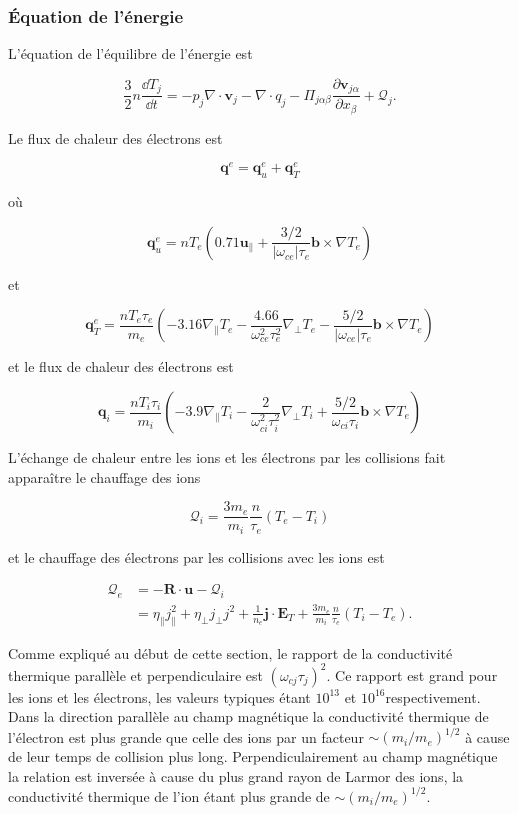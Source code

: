 \documentclass[main.tex]{subfiles}
\begin{document}
\subsubsection*{Équation de l'énergie}

L'équation de l'équilibre de l'énergie est

\[
	\frac{3}{2} n \frac{\dd T_j}{\dd t} = - p_j \nabla \cdot \bm{v}_j - \nabla \cdot q_j - \Pi_{j\alpha \beta} \frac{\partial \bm{v}_{j\alpha}}{\partial x_\beta} + \bm{\mathcal{Q}}_j.
\]

\nit Le flux de chaleur des électrons est

\[
	\bm{q}^e = \bm{q}_u^e + \bm{q}_T^e
\]

\nit où

\[
	\bm{q}_u^e = n T_e \left( 0.71 \bm{u}_\parallel + \frac{3/2}{\left\vert \omega_{ce}\right\vert \tau_e} \bm{b} \times \nabla T_e \right)
\]

\nit et

\begin{equation}
	\bm{q}_T^e = \frac{nT_e \tau_e}{m_e} \left( - 3.16\nabla_\parallel T_e - \frac{4.66}{\omega_{ce}^2 \tau_e^2} \nabla_\perp T_e - \frac{5/2}{\left\vert \omega_{ce}\right\vert \tau_e} \bm{b} \times \nabla T_e \right)
	\label{eq:brag:brag_flux_tbermique}
\end{equation}

\nit et le flux de chaleur des électrons est

\[
	\bm{q}_i = \frac{n T_i \tau_i}{m_i} \left( -3.9 \nabla_\parallel T_i - \frac{2}{\omega_{ci}^2 \tau_i^2} \nabla_\perp T_i + \frac{5/2}{\omega_{ci} \tau_i} \bm{b} \times \nabla T_e \right)
\]

\nit L'échange de chaleur entre les ions et les électrons par les collisions fait apparaître le chauffage des ions

\[
	\mathcal{Q}_i = \frac{3 m_e}{m_i} \frac{n}{\tau_e} \left( T_e - T_i \right)
\]

\nit et le chauffage des électrons par les collisions avec les ions est

\begin{align*}
	\mathcal{Q}_e &= - \bm{R} \cdot \bm{u} - \mathcal{Q}_i\\
	&= \eta_\parallel j_\parallel^2 + \eta_\perp j_\perp j^2 + \frac{1}{n_e} \bm{j} \cdot\bm{E}_T + \frac{3 m_e}{m_i} \frac{n}{\tau_e} \left( T_i - T_e\right).
\end{align*}

\nit Comme expliqué au début de cette section, le rapport de la conductivité thermique parallèle et perpendiculaire est \( \left( \omega_{cj } \tau_j\right)^2 \).
Ce rapport est grand pour les ions et les électrons, les valeurs typiques étant \( 10^{13} \) et \( 10^{16} \)respectivement.
Dans la direction parallèle au champ magnétique la conductivité thermique de l'électron est plus grande que celle des ions par un facteur \( \sim \left(m_i/m_e\right)^{1/2} \) à cause de leur temps de collision plus long.
Perpendiculairement au champ magnétique la relation est inversée à cause du plus grand rayon de Larmor des ions, la conductivité thermique de l'ion étant plus grande de \( \sim \left(m_i/m_e\right)^{1/2} \).
\end{document}
